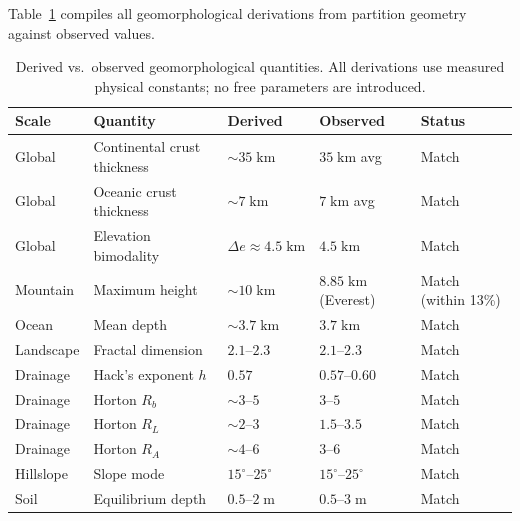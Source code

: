 \documentclass[10pt,twocolumn]{article}
\theoremstyle{definition}
\theoremstyle{remark}
\begin{document}
Table~\ref{tab:terrain} compiles all geomorphological
derivations from partition geometry against observed values.

\begin{table}[t]
\centering
\caption{Derived vs.\ observed geomorphological quantities.
All derivations use measured physical constants; no free
parameters are introduced.}
\label{tab:terrain}
\begin{tabular}{@{}llllp{3.2cm}@{}}
\toprule
\textbf{Scale} & \textbf{Quantity} & \textbf{Derived} &
\textbf{Observed} & \textbf{Status} \\
\midrule
Global & Continental crust thickness &
  $\sim 35\;\mathrm{km}$ &
  $35\;\mathrm{km}$ avg &
  Match \\
Global & Oceanic crust thickness &
  $\sim 7\;\mathrm{km}$ &
  $7\;\mathrm{km}$ avg &
  Match \\
Global & Elevation bimodality &
  $\Delta e\approx 4.5\;\mathrm{km}$ &
  $4.5\;\mathrm{km}$ &
  Match \\
Mountain & Maximum height &
  $\sim 10\;\mathrm{km}$ &
  $8.85\;\mathrm{km}$ (Everest) &
  Match (within 13\%) \\
Ocean & Mean depth &
  $\sim 3.7\;\mathrm{km}$ &
  $3.7\;\mathrm{km}$ &
  Match \\
Landscape & Fractal dimension &
  $2.1$--$2.3$ &
  $2.1$--$2.3$ &
  Match \\
Drainage & Hack's exponent $h$ &
  $0.57$ &
  $0.57$--$0.60$ &
  Match \\
Drainage & Horton $R_b$ &
  $\sim 3$--$5$ &
  $3$--$5$ &
  Match \\
Drainage & Horton $R_L$ &
  $\sim 2$--$3$ &
  $1.5$--$3.5$ &
  Match \\
Drainage & Horton $R_A$ &
  $\sim 4$--$6$ &
  $3$--$6$ &
  Match \\
Hillslope & Slope mode &
  $15^\circ$--$25^\circ$ &
  $15^\circ$--$25^\circ$ &
  Match \\
Soil & Equilibrium depth &
  $0.5$--$2\;\mathrm{m}$ &
  $0.5$--$3\;\mathrm{m}$ &
  Match \\
\bottomrule
\end{tabular}
\end{table}
\end{document}
